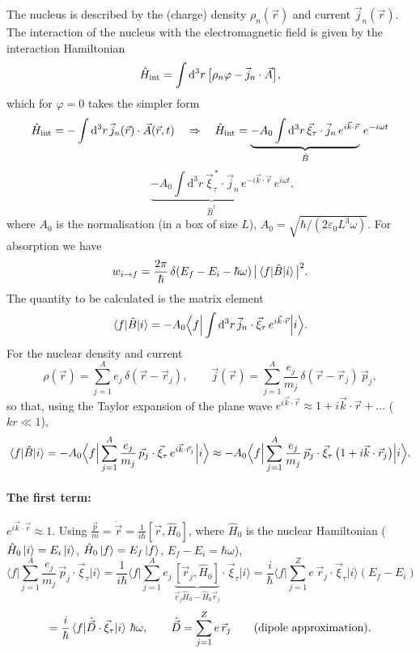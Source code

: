 \documentclass[11pt,a4paper]{article}
\newcommand{\op}[1]{\hat{#1}}
\newcommand{\ud}{\mathrm{d}}
\begin{document}
The nucleus is described by the (charge) density $\rho_n(\vec r)$ and current $\vec j_n(\vec r)$. The interaction of the nucleus with the electromagnetic field is given by the interaction Hamiltonian
\[
\op H_{\rm int}=\int\ud^3r\,\big[\rho_n\varphi-\vec j_n\cdot\vec A\big],
\]
which for $\varphi=0$ takes the simpler form
\[
\op H_{\rm int}=-\int\ud^3r\,\vec j_n(\vec r)\cdot\vec A(\vec r,t)
\quad\Rightarrow\quad
\op H_{\rm int}=\underbrace{-A_0\int\ud^3r\,\vec\xi_\tau\cdot\vec j_n\,e^{i\vec k\cdot\vec r}}_{\op B}\,e^{-i\omega t}
\]
\[
\qquad\ \underbrace{-A_0\int\ud^3r\,\vec\xi^{\,*}_\tau\cdot\vec j_n\,e^{-i\vec k\cdot\vec r}}_{\op B^\dagger}\,e^{i\omega t},
\]
where $A_0$ is the normalisation (in a box of size $L$), $A_0=\sqrt{\hbar/(2\varepsilon_0L^3\omega)}$.
For absorption we have
\[
w_{i\to f}=\frac{2\pi}{\hbar}\,\delta(E_f-E_i-\hbar\omega)\,\big|\braket{f|\op B|i}\big|^2 .
\]
The quantity to be calculated is the matrix element
\[
\braket{f|\op B|i}=-A_0\Big\langle f\Big|\int\ud^3r\,\vec j_n\cdot\vec\xi_\tau\,e^{i\vec k\cdot\vec r}\Big|i\Big\rangle .
\]
For the nuclear density and current
\[
\rho(\vec r)=\sum_{j=1}^Ae_j\,\delta(\vec r-\vec r_j),\qquad
\vec j(\vec r)=\sum_{j=1}^A\frac{e_j}{m_j}\,\delta(\vec r-\vec r_j)\,\vec p_j ,
\]
so that, using the Taylor expansion of the plane wave $e^{i\vec k\cdot\vec r}\approx1+i\vec k\cdot\vec r+\dots$ ($kr\ll1$),
\[
\braket{f|\op B|i}=-A_0\Big\langle f\Big|\sum_{j=1}^A\frac{e_j}{m_j}\,\vec p_j\cdot\vec\xi_\tau\,e^{i\vec k\cdot\vec r_j}\Big|i\Big\rangle
\approx-A_0\Big\langle f\Big|\sum_{j=1}^A\frac{e_j}{m_j}\,\vec p_j\cdot\vec\xi_\tau\,\big(1+i\vec k\cdot\vec r_j\big)\Big|i\Big\rangle .
\]

\paragraph{The first term:} $e^{i\vec k\cdot\vec r}\approx1$. Using $\frac{\vec p}{m}=\dot{\vec r}=\frac{1}{i\hbar}[\vec r,\op H_0]$, where $\op H_0$ is the nuclear Hamiltonian ($\op H_0\ket i=E_i\ket i$, $\op H_0\ket f=E_f\ket f$, $E_f-E_i=\hbar\omega$),
\[
\Big\langle f\Big|\sum_{j=1}^A\frac{e_j}{m_j}\,\vec p_j\cdot\vec\xi_\tau\Big|i\Big\rangle
=\frac{1}{i\hbar}\Big\langle f\Big|\sum_{j=1}^Ae_j\,\underbrace{[\vec r_j,\op H_0]}_{\vec r_j\op H_0-\op H_0\vec r_j}\cdot\vec\xi_\tau\Big|i\Big\rangle
=\frac{i}{\hbar}\Big\langle f\Big|\sum_{j=1}^Z e\,\vec r_j\cdot\vec\xi_\tau\Big|i\Big\rangle(E_f-E_i)
\]
\[
=\frac{i}{\hbar}\braket{f|\op{\vec D}\cdot\vec\xi_\tau|i}\,\hbar\omega,
\qquad
\op{\vec D}=\sum_{j=1}^Ze\,\vec r_j\qquad\text{(dipole approximation)}.
\]
\end{document}

